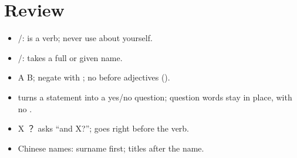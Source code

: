 \section*{Review}
\begin{itemize}
  \item {}/:  is a verb; never use  about yourself.
  \item {}/:  takes a full or given name.
  \item A  B; negate with ; no  before adjectives ().
  \item {} turns a statement into a yes/no question; question words stay in place,
        with no .
  \item X ？ asks ``and X?'';  goes right before the verb.
  \item Chinese names: surname first; titles after the name.
\end{itemize}
